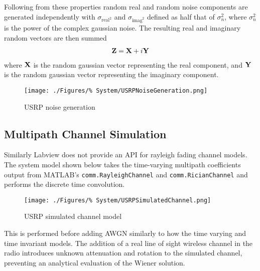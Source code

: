 Following from these properties random real and %
random noise components are generated independently %
with $\sigma_{\text{real}^{2}}$ and $\sigma_{\text{imag}^{2}}$ %
defined as half that of $\sigma_{n}^{2}$, where $\sigma_{n}^{2}$ %
is the power of the complex gaussian noise. The resulting %
real and imaginary random vectors are then summed
\begin{align}
	\bold{Z} = \bold{X} + i\bold{Y}
\end{align}
where $\bold{X}$ is the random gaussian vector %
representing the real component, and $\bold{Y}$ %
is the random gaussian vector representing the %
imaginary component.

\begin{figure}[ht]
	\texttt{[image: ./Figures/\%
	System/USRPNoiseGeneration.png]}
	\caption{USRP noise generation}
	\label{fig:USRPNoiseGen}
\end{figure}

\subsection{Multipath Channel Simulation}
Similarly Labview does not provide an API for rayleigh %
fading channel models. The system model shown below %
takes the time-varying multipath coefficients output %
from MATLAB's \texttt{comm.RayleighChannel} and %
\texttt{comm.RicianChannel} and performs the discrete time %
convolution.

\begin{figure}[ht]
	\texttt{[image: ./Figures/\%
	System/USRPSimulatedChannel.png]}
	\caption{USRP simulated channel model}
	\label{fig:USRPSimChan}
\end{figure}

This is performed before adding AWGN similarly to how the %
time varying and time invariant models. The addition of %
a real line of sight wireless channel in the radio introduces %
unknown attenuation and rotation to the simulated channel, %
preventing an analytical evaluation of the Wiener solution. %

